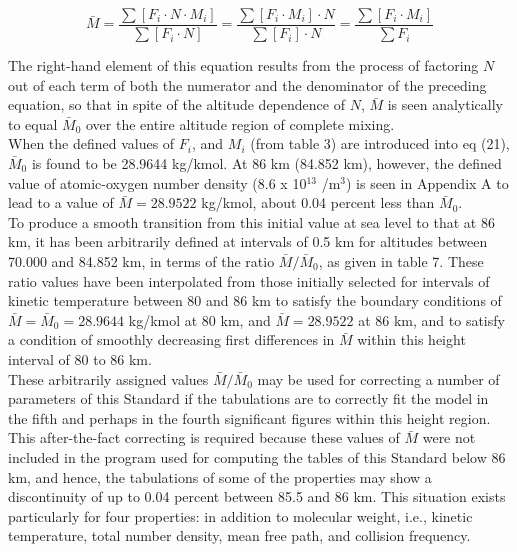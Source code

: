 \documentclass{article}
\begin{document}
\begin{equation}
 \bar{M} = \frac{\sum [F_i \cdot N \cdot M_i]}{\sum [F_i \cdot N]} = \frac{\sum [F_i \cdot M_i] \cdot N}{\sum [F_i] \cdot N} = \frac{\sum [F_i \cdot M_i]}{\sum F_i} \tag{21}
\end{equation}

The right-hand element of this equation results from the process of factoring \(N\) out of each term of both the numerator and the denominator of the preceding equation, so that in spite of the altitude dependence of \(N\), \(\bar{M}\) is seen analytically to equal \(\bar{M}_0\) over the entire altitude region of complete mixing.\\

When the defined values of \(F_i\), and \(M_i\) (from table 3) are introduced into eq (21), \(\bar{M}_0\) is found to be 28.9644 kg/kmol. At 86 km (84.852 km), however, the defined value of atomic-oxygen number density (8.6 x 10\(^{13}\) /m\(^3\)) is seen in Appendix A to lead to a value of \(\bar{M} = 28.9522\) kg/kmol, about 0.04 percent less than \(\bar{M}_0\).\\

To produce a smooth transition from this initial value at sea level to that at 86 km, it has been arbitrarily defined at intervals of 0.5 km for altitudes between 70.000 and 84.852 km, in terms of the ratio \(\bar{M} / \bar{M}_0\), as given in table 7. These ratio values have been interpolated from those initially selected for intervals of kinetic temperature between 80 and 86 km to satisfy the boundary conditions of \(\bar{M} = \bar{M}_0 = 28.9644\) kg/kmol at 80 km, and \(\bar{M} = 28.9522\) at 86 km, and to satisfy a condition of smoothly decreasing first differences in \(\bar{M}\) within this height interval of 80 to 86 km.\\

These arbitrarily assigned values \(\bar{M} / \bar{M}_0\) may be used for correcting a number of parameters of this Standard if the tabulations are to correctly fit the model in the fifth and perhaps in the fourth significant figures within this height region.\\

This after-the-fact correcting is required because these values of \(\bar{M}\) were not included in the program used for computing the tables of this Standard below 86 km, and hence, the tabulations of some of the properties may show a discontinuity of up to 0.04 percent between 85.5 and 86 km. This situation exists particularly for four properties: in addition to molecular weight, i.e., kinetic temperature, total number density, mean free path, and collision frequency.\\
\end{document}
